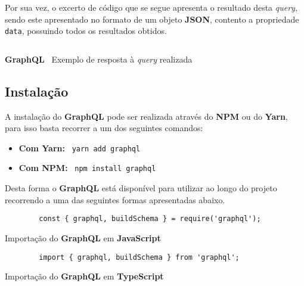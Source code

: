 Por sua vez, o excerto de código que se segue apresenta o resultado desta \textit{query}, sendo este apresentado no formato de um objeto \textbf{JSON}, contento a propriedade \texttt{data}, possuindo todos os resultados obtidos.

\begin{longlisting}
	\inputminted{json}{code/graphql/example-result.json}
	\caption{\textbf{GraphQL} \textemdash~Exemplo de resposta à \textit{query} realizada}
\end{longlisting}

\subsection{Instalação}

A instalação do \textbf{GraphQL} pode ser realizada através do \textbf{NPM} ou do \textbf{Yarn}, para isso basta recorrer a um dos seguintes comandos:

\begin{itemize}
	\item \textbf{Com Yarn:} ~\texttt{yarn add graphql}
	\item \textbf{Com NPM:} ~\texttt{npm install graphql}
\end{itemize}

Desta forma o \textbf{GraphQL} está disponível para utilizar ao longo do projeto recorrendo a uma das seguintes formas apresentadas abaixo.

\begin{longlisting}
	\begin{verbatim}
		const { graphql, buildSchema } = require('graphql');
	\end{verbatim}

	\caption{Importação do \textbf{GraphQL} em \textbf{JavaScript}}
\end{longlisting}

\begin{longlisting}
	\begin{verbatim}
		import { graphql, buildSchema } from 'graphql';
	\end{verbatim}

	\caption{Importação do \textbf{GraphQL} em \textbf{TypeScript}}
\end{longlisting}